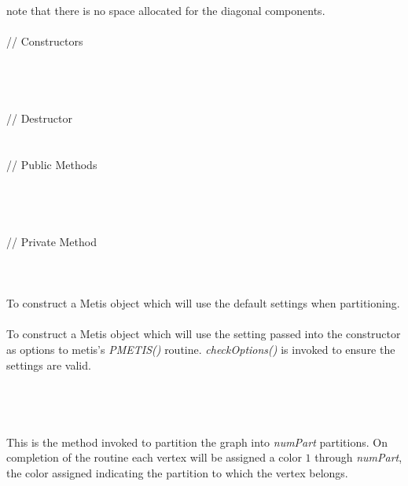 \noindent note that there is no space allocated for the diagonal
components. \\

  \\
\indent\indent // Constructors  \\
\indent{}  \\ \\
\indent{}  \\ \\
\indent\indent // Destructor  \\
\indent{}  \\ \\
\indent\indent // Public Methods  \\
\indent{} \\
\indent{}\\
\indent{}  \\ \\
\indent\indent // Private Method  \\
\indent{} \\


  \\
  \\
To construct a Metis object which will use the default settings when
partitioning. \\ 

  \\
To construct a Metis object which will use the setting passed into the
constructor as options to metis's {\em PMETIS()} routine. {\em
checkOptions()} is invoked to ensure the settings are valid. \\

  \\
  \\

  \\
 \\
This is the method invoked to partition the graph into {\em numPart}
partitions. On completion of the routine each vertex will be assigned
a color $1$ through {\em numPart}, the color assigned indicating the
partition to which the vertex belongs. 

